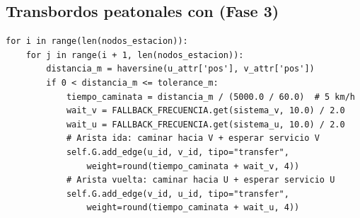 \subsection*{Transbordos peatonales con  (Fase 3)}

\begin{lstlisting}[style=estiloPython,
    caption={Cálculo del peso de aristas peatonales: caminata + espera al
             siguiente servicio. \texttt{src/core/services/graph\_builder.py}.},
    label=lst:vft-snapping]
for i in range(len(nodos_estacion)):
    for j in range(i + 1, len(nodos_estacion)):
        distancia_m = haversine(u_attr['pos'], v_attr['pos'])
        if 0 < distancia_m <= tolerance_m:
            tiempo_caminata = distancia_m / (5000.0 / 60.0)  # 5 km/h
            wait_v = FALLBACK_FRECUENCIA.get(sistema_v, 10.0) / 2.0
            wait_u = FALLBACK_FRECUENCIA.get(sistema_u, 10.0) / 2.0
            # Arista ida: caminar hacia V + esperar servicio V
            self.G.add_edge(u_id, v_id, tipo="transfer",
                weight=round(tiempo_caminata + wait_v, 4))
            # Arista vuelta: caminar hacia U + esperar servicio U
            self.G.add_edge(v_id, u_id, tipo="transfer",
                weight=round(tiempo_caminata + wait_u, 4))
\end{lstlisting}
